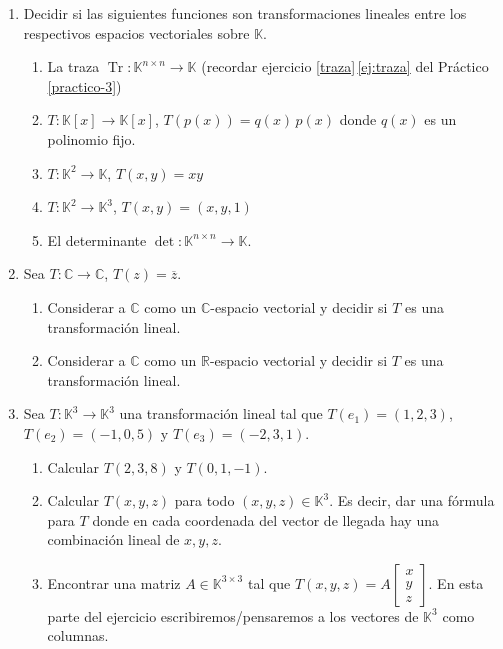 \begin{enumerate}[topsep=6pt, itemsep=.4cm]
\item Decidir si las siguientes funciones son transformaciones lineales entre los respectivos espacios vectoriales sobre $\mathbb{K}$.
    \begin{enumerate}
    \item La traza $\operatorname{Tr}:\mathbb{K}^{n\times n}\longrightarrow\mathbb{K}$ (recordar ejercicio \ref{traza}\,\ref{ej:traza} del Práctico  \ref{practico-3}) 
    \item $T:\mathbb{K}[x]\longrightarrow\mathbb{K}[x]$, $T(p(x))=q(x)\,p(x)$ donde $q(x)$ es un polinomio fijo.
    \item $T:\mathbb{K}^2\longrightarrow\mathbb{K}$, $T(x,y)=xy$
    \item $T:\mathbb{K}^2\longrightarrow\mathbb{K}^3$, $T(x,y)=(x,y,1)$
    \item El determinante $\operatorname{det}:\mathbb{K}^{n\times n}\longrightarrow\mathbb{K}$.
    \end{enumerate}


\item Sea $T:\mathbb{C}\longrightarrow\mathbb{C}$, $T(z)=\overline{z}$.
\begin{enumerate}
 \item Considerar a $\mathbb{C}$ como un $\mathbb{C}$-espacio vectorial y decidir si $T$ es una transformación lineal.
 \item Considerar a $\mathbb{C}$ como un $\mathbb{R}$-espacio vectorial y decidir si $T$ es una transformación lineal.
\end{enumerate}


\item\label{T en la base} Sea $T:\mathbb{K}^3\longrightarrow\mathbb{K}^3$ una transformación lineal tal que $T(e_1)=(1,2,3)$, $T(e_2)=(-1,0,5)$ y $T(e_3)=(-2,3,1)$. 
    \begin{enumerate}
        \item Calcular $T(2,3,8)$ y $T(0,1,-1)$. 
        \item\label{T en la base b} Calcular $T(x,y,z)$ para todo $(x,y,z)\in\mathbb{K}^3$. Es decir, dar una fórmula para $T$ donde en cada coordenada del vector de llegada hay una combinación lineal de $x,y,z$.
        \item\label{matriz otro}  Encontrar una matriz $A\in\mathbb{K}^{3\times3}$ tal que $T(x,y,z)=A\begin{bmatrix}  x\\y\\z \end{bmatrix}$. En esta parte del ejercicio escribiremos/pensaremos a los vectores de $\mathbb{K}^3$ como columnas.
    \end{enumerate}


\end{enumerate}
